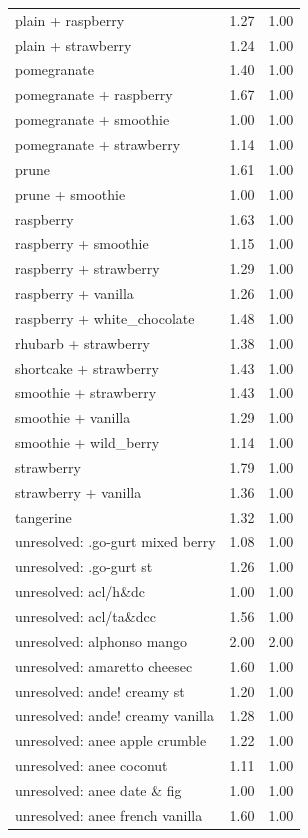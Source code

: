 \begin{table}
\begin{tabular}{lrr}
plain + raspberry & 1.27 & 1.00 \\
plain + strawberry & 1.24 & 1.00 \\
pomegranate & 1.40 & 1.00 \\
pomegranate + raspberry & 1.67 & 1.00 \\
pomegranate + smoothie & 1.00 & 1.00 \\
pomegranate + strawberry & 1.14 & 1.00 \\
prune & 1.61 & 1.00 \\
prune + smoothie & 1.00 & 1.00 \\
raspberry & 1.63 & 1.00 \\
raspberry + smoothie & 1.15 & 1.00 \\
raspberry + strawberry & 1.29 & 1.00 \\
raspberry + vanilla & 1.26 & 1.00 \\
raspberry + white\_chocolate & 1.48 & 1.00 \\
rhubarb + strawberry & 1.38 & 1.00 \\
shortcake + strawberry & 1.43 & 1.00 \\
smoothie + strawberry & 1.43 & 1.00 \\
smoothie + vanilla & 1.29 & 1.00 \\
smoothie + wild\_berry & 1.14 & 1.00 \\
strawberry & 1.79 & 1.00 \\
strawberry + vanilla & 1.36 & 1.00 \\
tangerine & 1.32 & 1.00 \\
unresolved: .go-gurt mixed berry & 1.08 & 1.00 \\
unresolved: .go-gurt st & 1.26 & 1.00 \\
unresolved: acl/h\&dc & 1.00 & 1.00 \\
unresolved: acl/ta\&dcc & 1.56 & 1.00 \\
unresolved: alphonso mango & 2.00 & 2.00 \\
unresolved: amaretto cheesec & 1.60 & 1.00 \\
unresolved: ande! creamy st & 1.20 & 1.00 \\
unresolved: ande! creamy vanilla & 1.28 & 1.00 \\
unresolved: anee apple crumble & 1.22 & 1.00 \\
unresolved: anee coconut & 1.11 & 1.00 \\
unresolved: anee date \& fig & 1.00 & 1.00 \\
unresolved: anee french vanilla & 1.60 & 1.00 \\

\end{tabular}
\end{table}

